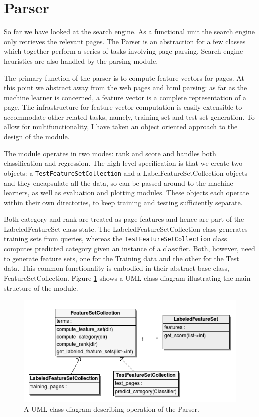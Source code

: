 \documentclass[12pt,twoside,notitlepage]{report}
\begin{document}
\section{Parser}

So far we have looked at the search engine. As a functional unit the search
engine only retrieves the relevant pages. The Parser is an abstraction for a
few classes which together perform a series of tasks involving page parsing. 
Search engine heuristics are also handled by the parsing module.

The primary function of the parser is to compute feature vectors for pages.
At this point we abstract away from the web pages and html parsing:
as far as the machine learner is concerned, a feature vector is a complete
representation of a page.
The infrastructure for feature vector computation is easily extensible to
accommodate other related tasks, namely, training set and test set generation.
To allow for multifunctionality, I have taken an object oriented approach to the
design of the module.

The module operates in two modes: rank and score and handles both
classification and regression. The high level specification is that we create
two objects: a \texttt{TestFeatureSetCollection} and a LabelFeatureSetCollection
objects and they encapsulate all the data, so can be passed around to the
machine learners, as well as evaluation and plotting modules. These objects
each operate within their own directories, to keep training and testing
sufficiently separate. 

Both category and rank are treated as page features and hence are part of the
LabeledFeatureSet class state.  The LabeledFeatureSetCollection class generates
training sets from queries, whereas the \texttt{TestFeatureSetCollection} class computes
predicted category given an instance of a classifier. Both, however, need to generate
feature sets, one for the Training data and the other for the Test data. This
common functionality is embodied in their abstract base class, FeatureSetCollection.
Figure \ref{uml} shows a UML class diagram illustrating the main structure
of the module.

\begin{figure}
\centering
\includegraphics[scale=0.5]{figs/uml.png}
\caption{A UML class diagram describing operation of the Parser.}
\label{uml}
\end{figure}
\end{document}

